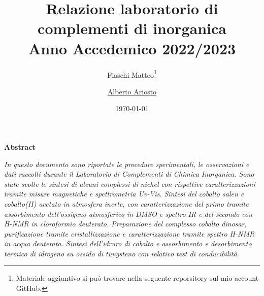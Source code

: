 \documentclass[10pt]{article}
\title{\huge{Relazione laboratorio di complementi di inorganica}
\vspace{1mm}\\
\Large{Anno Accedemico 2022/2023}}
\author{\href{mailto:m.fiaschi10@studenti.unipi.it}{Fiaschi Matteo\footnote{Materiale aggiuntivo si può trovare nella seguente reporsitory sul mio account \href{https://github.com/mfiaschi5/labinorganica}{GitHub}.}} \and \href{mailto:a.ariosto@studenti.unipi.it}{Alberto Ariosto}}
\date{\today}
\begin{document}
\maketitle
\begin{center}
    \textbf{Abstract}
\end{center}
\noindent \textit{ In questo documento sono riportate le procedure sperimentali, le osservazioni e dati raccolti durante il Laboratorio di Complementi di Chimica Inorganica. Sono state svolte le sintesi di alcuni complessi di nichel con rispettive caratterizzazioni tramite misure magnetiche e spettrometria Uv-Vis. Sintesi del cobalto salen e cobalto(II) acetato in atmosfera inerte, con caratterizzazione del primo tramite assorbimento dell'ossigeno atmosferico in DMSO e spettro IR e del secondo con H-NMR in cloroformio deuterato. Preparazione del complesso cobalto dinosar, purificazione tramite cristallizzazione e  caratterizzazione tramite spettro H-NMR in acqua deuterata. Sintesi dell'idruro di  cobalto e assorbimento e desorbimento termico di idrogeno su ossido di tungsteno con relativo test di conducibilità. }










\end{document}
